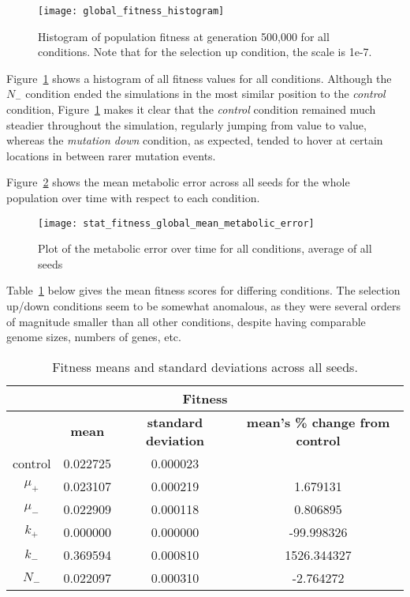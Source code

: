 \begin{figure}[H]
	\texttt{[image: global\_fitness\_histogram]}
	\caption[Mean fitness histogram]{Histogram of population fitness at generation 500,000 for all conditions. Note that for the selection up condition, the scale is 1e-7.}
	\label{fig:global_fitness_histogram}
\end{figure}
Figure~\ref{fig:global_fitness_histogram} shows a histogram of all fitness values for all conditions. Although the $N_-$ condition ended the simulations in the most similar position to the \textit{control} condition, Figure~\ref{fig:global_fitness_histogram} makes it clear that the \textit{control} condition remained much steadier throughout the simulation, regularly jumping from value to value, whereas the \textit{mutation down} condition, as expected, tended to hover at certain locations in between rarer mutation events. 

Figure~\ref{fig:mean_metabolic_error} shows the mean metabolic error across all seeds for the whole population over time with respect to each condition. 
\begin{figure}[H]
	\texttt{[image: stat\_fitness\_global\_mean\_metabolic\_error]}
	\caption[Metabolic error]{Plot of the metabolic error over time for all conditions, average of all seeds}
	\label{fig:mean_metabolic_error}
\end{figure}

Table~\ref{table:fitness_means_std_dev} below gives the mean fitness scores for differing conditions. The selection up/down conditions seem to be somewhat anomalous, as they were several orders of magnitude smaller than all other conditions, despite having comparable genome sizes, numbers of genes, etc.
\begin{table}[H]
	\centering
	\begin{tabular}{|c||c|c|c|}
		\hline
		\multicolumn{4}{c}{\Large \textbf{Fitness}} \\
		\hline
		& \textbf{mean} & \textbf{standard deviation} & \textbf{mean's \% change from control} \\
		\hline \hline
		control & 0.022725 & 0.000023 & \textemdash \\ 
		\hline
		$\mu_+$ & 0.023107 & 0.000219 & 1.679131 \\ 
		\hline
		$\mu_-$ & 0.022909 & 0.000118 & 0.806895 \\ 
		\hline
		$k_+$ & 0.000000 & 0.000000 & -99.998326 \\ 
		\hline
		$k_-$ & 0.369594 & 0.000810 & 1526.344327 \\ 
		\hline
		$N_-$ & 0.022097 & 0.000310 & -2.764272 \\ 
		\hline
	\end{tabular}
	\caption[Fitness means and standard deviations.]{Fitness means and standard deviations across all seeds. }
	\label{table:fitness_means_std_dev}
\end{table}

